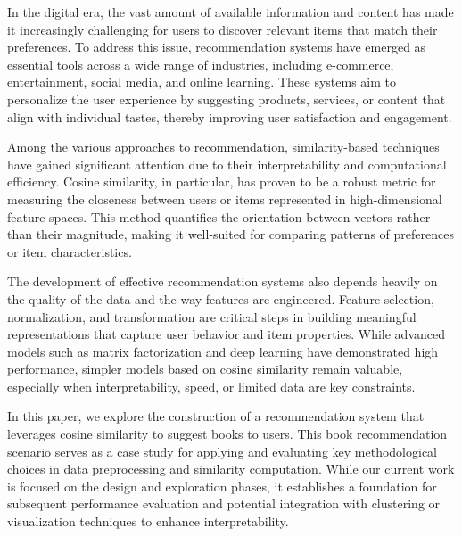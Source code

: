 In the digital era, the vast amount of available information and content has made it increasingly challenging for users to discover relevant items that match their preferences. To address this issue, recommendation systems have emerged as essential tools across a wide range of industries, including e-commerce, entertainment, social media, and online learning. These systems aim to personalize the user experience by suggesting products, services, or content that align with individual tastes, thereby improving user satisfaction and engagement.

\vspace{0.5\baselineskip}

Among the various approaches to recommendation, similarity-based techniques have gained significant attention due to their interpretability and computational efficiency. Cosine similarity, in particular, has proven to be a robust metric for measuring the closeness between users or items represented in high-dimensional feature spaces. This method quantifies the orientation between vectors rather than their magnitude, making it well-suited for comparing patterns of preferences or item characteristics.

\vspace{0.5\baselineskip}

The development of effective recommendation systems also depends heavily on the quality of the data and the way features are engineered. Feature selection, normalization, and transformation are critical steps in building meaningful representations that capture user behavior and item properties. While advanced models such as matrix factorization and deep learning have demonstrated high performance, simpler models based on cosine similarity remain valuable, especially when interpretability, speed, or limited data are key constraints.

\vspace{0.5\baselineskip}

In this paper, we explore the construction of a recommendation system that leverages cosine similarity to suggest books to users. This book recommendation scenario serves as a case study for applying and evaluating key methodological choices in data preprocessing and similarity computation. While our current work is focused on the design and exploration phases, it establishes a foundation for subsequent performance evaluation and potential integration with clustering or visualization techniques to enhance interpretability.
